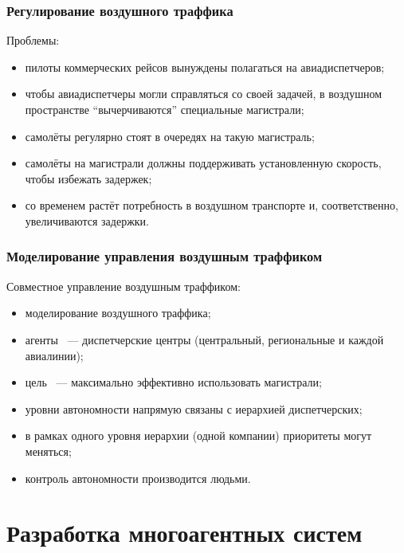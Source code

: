 \documentclass{beamer}
\begin{document}
\begin{frame}
  \frametitle{Регулирование воздушного траффика}
  Проблемы:
  \begin{itemize}
    \item пилоты коммерческих рейсов вынуждены полагаться на авиадиспетчеров;
    \item чтобы авиадиспетчеры могли справляться со своей задачей, в воздушном
      пространстве ``вычерчиваются'' специальные магистрали;
    \item самолёты регулярно стоят в очередях на такую магистраль;
    \item самолёты на магистрали должны поддерживать установленную скорость,
      чтобы избежать задержек;
    \item со временем растёт потребность в воздушном транспорте и, соответственно,
      увеличиваются задержки.
  \end{itemize}
\end{frame}

\begin{frame}
  \frametitle{Моделирование управления воздушным траффиком}
  Совместное управление воздушным траффиком:
  \begin{itemize}
    \item моделирование воздушного траффика;
    \item агенты ~--- диспетчерские центры (центральный, региональные и каждой авиалинии);
    \item цель ~--- максимально эффективно использовать магистрали;
    \item уровни автономности напрямую связаны с иерархией диспетчерских;
    \item в рамках одного уровня иерархии (одной компании) приоритеты могут меняться;
    \item контроль автономности производится людьми.
  \end{itemize}
\end{frame}

\section{Разработка многоагентных систем}
\end{document}
